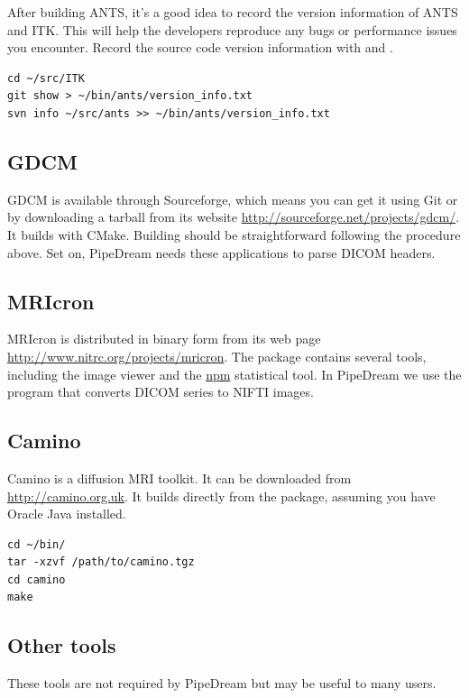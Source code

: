 \documentclass{InsightArticle}
\begin{document}
After building ANTS, it's a good idea to record the version information of ANTS and ITK. This will help the developers reproduce any bugs or performance issues you encounter. Record the source code version information with  and .
\begin{lstlisting}[style=bash]
cd ~/src/ITK
git show > ~/bin/ants/version_info.txt
svn info ~/src/ants >> ~/bin/ants/version_info.txt 
\end{lstlisting}


\subsection{GDCM}

GDCM is available through Sourceforge, which means you can get it using Git or by downloading a tarball from its website \url{http://sourceforge.net/projects/gdcm/}. It builds with CMake. Building should be straightforward following the procedure above. Set  on, PipeDream needs these applications to parse DICOM headers.

\subsection{MRIcron}

MRIcron is distributed in binary form from its web page \url{http://www.nitrc.org/projects/mricron}. The package contains several tools, including the  image viewer and the \url{npm} statistical tool. In PipeDream we use the  program that converts DICOM series to NIFTI images.

\subsection{Camino}

Camino is a diffusion MRI toolkit. It can be downloaded from \url{http://camino.org.uk}. It builds directly from the package, assuming you have Oracle Java installed.
\begin{lstlisting}[style=bash]
cd ~/bin/
tar -xzvf /path/to/camino.tgz
cd camino
make
\end{lstlisting}


\subsection{Other tools}

These tools are not required by PipeDream but may be useful to many users.
\end{document}
